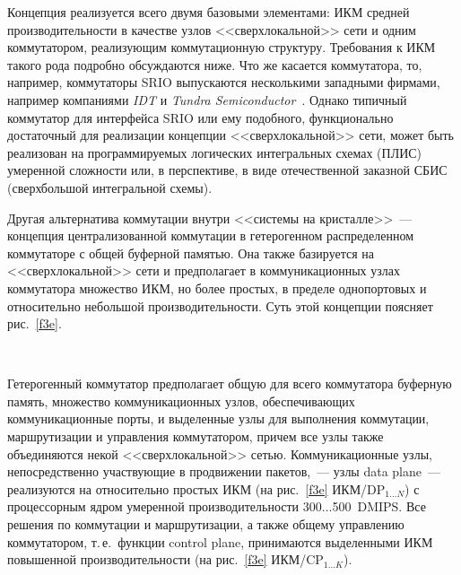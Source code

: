 \begin{multicols}{2}
     Концепция реализуется всего двумя базовыми элементами: ИКМ средней 
производительности в качестве узлов <<сверхлокальной>> сети и одним коммутатором, 
реализующим коммутационную структуру. Требования к ИКМ такого рода подробно 
обсуждаются ниже. Что же касается коммутатора, то, например, коммутаторы SRIO 
выпускаются несколькими западными фирмами, например компаниями \textit{IDT} и 
\textit{Tundra Semiconductor}~\cite{14e, 15e}. Однако типичный коммутатор для интерфейса 
SRIO или ему подобного, функционально достаточный для реализации концепции 
<<сверхлокальной>> сети, может быть реализован на программируемых логических интегральных схемах
(ПЛИС) умеренной сложности или, в 
перспективе, в виде отечественной заказной СБИС (сверхбольшой интегральной схемы).
     
     Другая альтернатива коммутации внутри <<сис\-те\-мы на кристалле>>~--- концепция 
централизованной коммутации в гетерогенном распределенном коммутаторе с общей 
буферной памятью. Она %
также базируется на <<сверхлокальной>> сети и пред\-по\-ла\-га\-ет в 
коммуникационных узлах ком\-му\-та\-тора множество ИКМ, но более простых, в пределе 
однопортовых и относительно небольшой %
производительности. Суть этой концепции 
поясняет  рис.~\ref{f3e}.
{

}     

\begin{figure*} %
\vspace*{1pt}
\begin{center}
\mbox{%
\epsfxsize=166.336mm
}
\end{center}
\vspace*{-9pt}
\vspace*{6pt}
\end{figure*}

     Гетерогенный коммутатор предполагает общую для всего коммутатора буферную 
память, множество коммуникационных узлов, обес\-пе\-чи\-ва\-ющих коммуникационные порты, 
и выделенные узлы для выполнения коммутации, маршрутизации и управ\-ле\-ния 
коммутатором, причем все узлы также %
объеди\-ня\-ют\-ся некой <<сверхлокальной>> \mbox{сетью}. 
Коммуникационные узлы, непосредственно участ\-ву\-ющие в продвижении пакетов,~--- узлы 
data plane~--- реализуются на относительно прос\-тых ИКМ (на рис.~\ref{f3e} ИКМ/DP$_{1\ldots 
N}$) с %
процессорным ядром умеренной производительности 300$\ldots$500~DMIPS. Все 
решения по коммутации и маршрутизации, а также общему управлению коммутатором, т.\,е.\
функции control plane, принимаются выделенными ИКМ повышенной 
производительности (на рис.~\ref{f3e} ИКМ/CP$_{1\ldots K}$).
     

\end{multicols}
